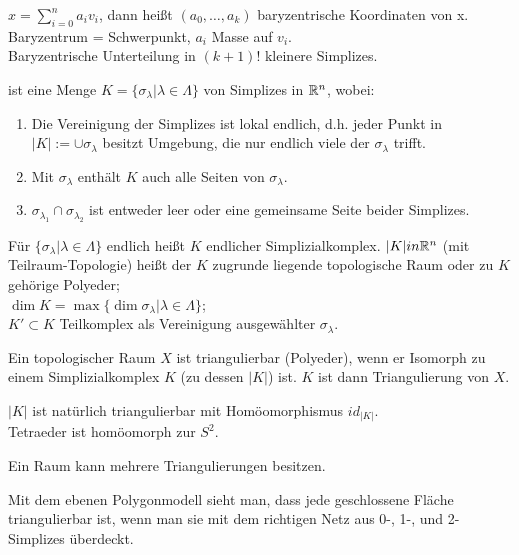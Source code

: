 \begin{bem}
	$x=\sum_{i=0}^n a_i v_i$, dann heißt $(a_0,\dots,a_k)$ baryzentrische Koordinaten von x. 
	Baryzentrum = Schwerpunkt, $a_i$ Masse auf $v_i$.\\
	Baryzentrische Unterteilung in $(k+1)!$ kleinere Simplizes.
\end{bem}

\begin{defi}[Simplizialkomplex]
	ist eine Menge $K = \{\sigma_\lambda | \lambda \in \Lambda\}$ von Simplizes in $\mathbb R^n$, wobei:
	\begin{enumerate}
		\item Die Vereinigung der Simplizes ist lokal endlich, d.h. jeder Punkt in 
		$|K| := \cup\sigma_\lambda$ besitzt Umgebung, die nur endlich viele der 
		$\sigma_\lambda$ trifft.
		\item Mit $\sigma_\lambda$ enthält $K$ auch alle Seiten von $\sigma_\lambda$.
		\item $\sigma_{\lambda_1} \cap \sigma_{\lambda_2}$ ist entweder leer oder 
		eine gemeinsame Seite beider Simplizes.
	\end{enumerate}
	Für $\{\sigma_\lambda | \lambda \in \Lambda\}$ endlich heißt $K$ endlicher Simplizialkomplex.
	$|K| in \mathbb R^n$ (mit Teilraum-Topologie) heißt der $K$ zugrunde liegende topologische Raum
	oder zu $K$ gehörige Polyeder;\\
	$\dim K = \max \{\dim\sigma_\lambda | \lambda \in \Lambda\}$;\\
	$K'\subset K$ Teilkomplex als Vereinigung ausgewählter $\sigma_\lambda$.
\end{defi}

\begin{defi}[Triangulierbar]
	Ein topologischer Raum $X$ ist triangulierbar (Polyeder), wenn er Isomorph zu 
	einem Simplizialkomplex $K$ (zu dessen $|K|$) ist. 
	$K$ ist dann Triangulierung von $X$.
\end{defi}

\begin{bsp}
	$|K|$ ist natürlich triangulierbar mit Homöomorphismus $id_{|K|}$.\\
	Tetraeder ist homöomorph zur $S^2$.
\end{bsp}

\begin{bem}
	Ein Raum kann mehrere Triangulierungen besitzen.
\end{bem}

\begin{bem}
	Mit dem ebenen Polygonmodell sieht man, dass jede geschlossene Fläche triangulierbar ist,
	wenn man sie mit dem richtigen Netz aus 0-, 1-, und 2-Simplizes überdeckt.
\end{bem}

